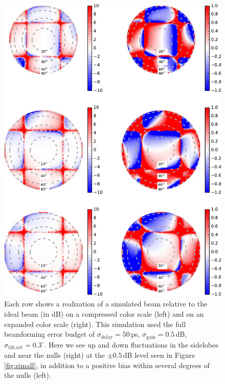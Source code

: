 \begin{figure}[h]
\centering
\includegraphics[width=5in]{chap2_beamforming_errors/groupdelays50psgains0_5dBthetaall0_3deg_simbeams-eps-converted-to.pdf}
\caption[Each row shows a realization of a simulated beam relative to the ideal beam.]{Each row shows a realization of a simulated beam relative to the ideal beam (in dB) on a compressed color scale (left) and on an expanded color scale (right). This simulation used the full beamforming error budget of $\sigma_\text{delay}=50$\,ps, $\sigma_\text{gain}=0.5$\,dB, $\sigma_\text{tilt,rot}=0.3^\circ$. Here we see up and down fluctuations in the sidelobes and near the nulls (right) at the $\pm0.5$\,dB level seen in Figure \ref{fig:simall}, in addition to a positive bias within several degrees of the nulls (left). }
\label{fig:simallsamples}
\end{figure}

